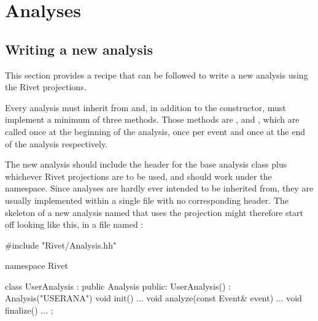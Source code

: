 




\section{Analyses}

\subsection{Writing a new analysis}

This section provides a recipe that can be followed to write a new analysis
using the Rivet projections.

Every analysis must inherit from  and, in addition to the
constructor, must implement a minimum of three methods.  Those methods are
,  and , which
are called once at the beginning of the analysis, once per event and once at the
end of the analysis respectively.

The new analysis should include the header for the base analysis class plus
whichever Rivet projections are to be used, and should work under the
 namespace. Since analyses are hardly ever intended to be inherited
from, they are usually implemented within a single  file with no
corresponding header. The skeleton of a new analysis named 
that uses the  projection might therefore start off looking
like this, in a file named :
%
\begin{snippet}
#include "Rivet/Analysis.hh"

namespace Rivet {

  class UserAnalysis : public Analysis {
  public:
    UserAnalysis() : Analysis("USERANA") { }
    void init() { ... }
    void analyze(const Event& event) { ... }
    void finalize() { ... }
  };

}
\end{snippet}

